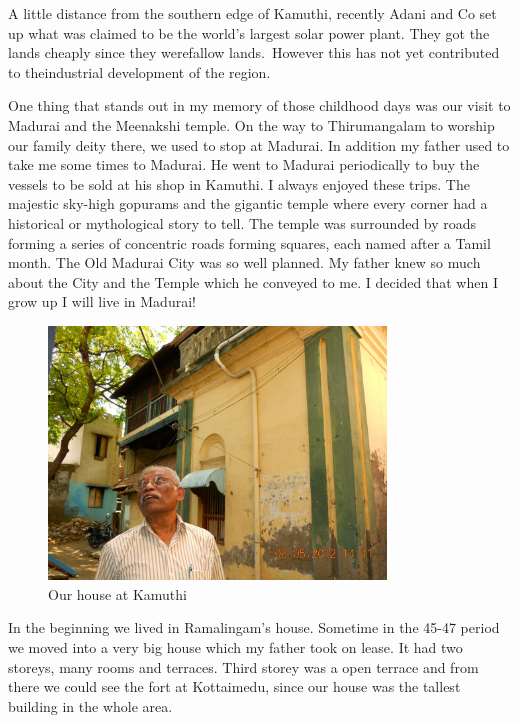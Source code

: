 A little distance from the southern edge of Kamuthi, recently Adani and 
Co set up what was claimed to be the world's largest solar power plant. 
They got the lands cheaply since they were\break fallow lands.\ However this 
has not yet contributed to the\break industrial development of the region.

One thing that stands out in my memory of those childhood days was our 
visit to Madurai and the Meenakshi temple. On the way to Thirumangalam 
to worship our family deity there, we used to stop at Madurai. In 
addition my father used to take me some times to Madurai. He went to 
Madurai periodically to buy the vessels to be sold at his shop in 
Kamuthi. I always enjoyed these trips. The majestic sky-high gopurams 
and the gigantic temple where every corner had a historical or 
mythological story to tell. The temple was surrounded by roads forming a 
series of concentric roads forming squares, each named after a Tamil 
month. The Old Madurai City was so well planned. My father knew so much 
about the City and the Temple which he conveyed to me. I decided that 
when I grow up I will live in Madurai!
\smallskip

\begin{figure}[h]
\centering
\includegraphics[width=0.8\textwidth]{images/new-images/02-Rajaji-home.jpg}
\caption{Our house at Kamuthi}
\end{figure}

In the beginning we lived in Ramalingam's house. Sometime in the 45-47 
period we moved into a very big house which my father took on lease. It 
had two storeys, many rooms and terraces. Third storey was a open 
terrace and from there we could see the fort at Kottaimedu, since our 
house was the tallest building in the whole area.

